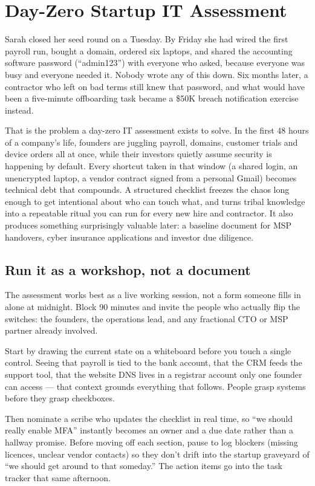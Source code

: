 \section{Day-Zero Startup IT Assessment}
Sarah closed her seed round on a Tuesday. By Friday she had wired the first payroll run, bought a domain, ordered six laptops, and shared the accounting software password (``admin123'') with everyone who asked, because everyone was busy and everyone needed it. Nobody wrote any of this down. Six months later, a contractor who left on bad terms still knew that password, and what would have been a five-minute offboarding task became a \$50K breach notification exercise instead.


That is the problem a day-zero IT assessment exists to solve. In the first 48 hours of a company's life, founders are juggling payroll, domains, customer trials and device orders all at once, while their investors quietly assume security is happening by default. Every shortcut taken in that window (a shared login, an unencrypted laptop, a vendor contract signed from a personal Gmail) becomes technical debt that compounds. A structured checklist freezes the chaos long enough to get intentional about who can touch what, and turns tribal knowledge into a repeatable ritual you can run for every new hire and contractor. It also produces something surprisingly valuable later: a baseline document for MSP handovers, cyber insurance applications and investor due diligence.



\subsection{Run it as a workshop, not a document}


The assessment works best as a live working session, not a form someone fills in alone at midnight. Block 90 minutes and invite the people who actually flip the switches: the founders, the operations lead, and any fractional CTO or MSP partner already involved.


Start by drawing the current state on a whiteboard before you touch a single control. Seeing that payroll is tied to the bank account, that the CRM feeds the support tool, that the website DNS lives in a registrar account only one founder can access — that context grounds everything that follows. People grasp systems before they grasp checkboxes.


Then nominate a scribe who updates the checklist in real time, so ``we should really enable MFA'' instantly becomes an owner and a due date rather than a hallway promise. Before moving off each section, pause to log blockers (missing licences, unclear vendor contacts) so they don't drift into the startup graveyard of ``we should get around to that someday.'' The action items go into the task tracker that same afternoon.



